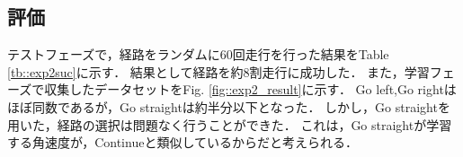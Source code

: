 \newpage
\subsection{評価}
テストフェーズで，経路をランダムに60回走行を行った結果をTable \ref{tb::exp2suc}に示す．
結果として経路を約8割走行に成功した．
また，学習フェーズで収集したデータセットをFig. \ref{fig::exp2_result}に示す．
Go left,Go rightはほぼ同数であるが，Go straightは約半分以下となった．
しかし，Go straightを用いた，経路の選択は問題なく行うことができた．
これは，Go straightが学習する角速度が，Continueと類似しているからだと考えられる．


  
